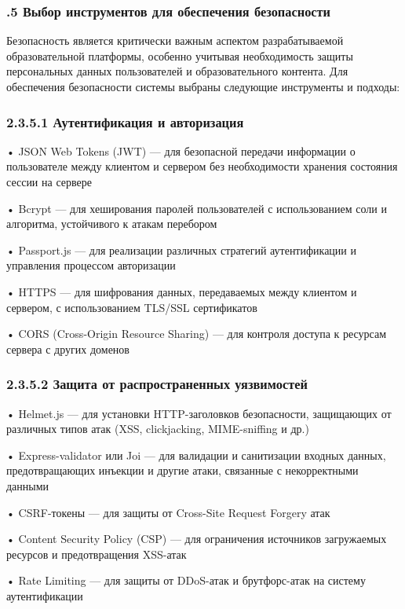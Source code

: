 \subtitlespace

\subsubsection*{ 
  \gostTitleFont
  .5 Выбор инструментов для обеспечения безопасности
} 

\subtitlespace

{\gostFont

  \par \redline Безопасность является критически важным аспектом разрабатываемой образовательной платформы, особенно учитывая необходимость защиты персональных данных пользователей и образовательного контента. Для обеспечения безопасности системы выбраны следующие инструменты и подходы:

  \subsubsection*{2.3.5.1 Аутентификация и авторизация}

  \par \redline • JSON Web Tokens (JWT) — для безопасной передачи информации о пользователе между клиентом и сервером без необходимости хранения состояния сессии на сервере
  \par \redline • Bcrypt — для хеширования паролей пользователей с использованием соли и алгоритма, устойчивого к атакам перебором
  \par \redline • Passport.js — для реализации различных стратегий аутентификации и управления процессом авторизации
  \par \redline • HTTPS — для шифрования данных, передаваемых между клиентом и сервером, с использованием TLS/SSL сертификатов
  \par \redline • CORS (Cross-Origin Resource Sharing) — для контроля доступа к ресурсам сервера с других доменов

  \subsubsection*{2.3.5.2 Защита от распространенных уязвимостей}

  \par \redline • Helmet.js — для установки HTTP-заголовков безопасности, защищающих от различных типов атак (XSS, clickjacking, MIME-sniffing и др.)
  \par \redline • Express-validator или Joi — для валидации и санитизации входных данных, предотвращающих инъекции и другие атаки, связанные с некорректными данными
  \par \redline • CSRF-токены — для защиты от Cross-Site Request Forgery атак
  \par \redline • Content Security Policy (CSP) — для ограничения источников загружаемых ресурсов и предотвращения XSS-атак
  \par \redline • Rate Limiting — для защиты от DDoS-атак и брутфорс-атак на систему аутентификации

}
